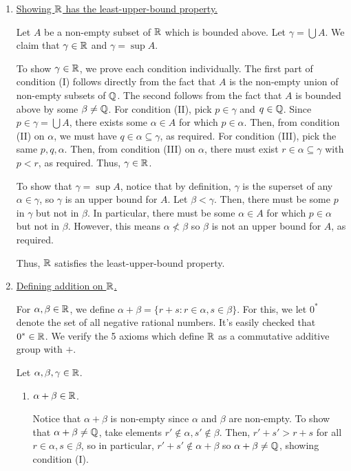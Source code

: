 \begin{enumerate}[Step 1.]
\item \underline{Showing $\mathbb{R}$ has the least-upper-bound property.}

Let $A$ be a non-empty subset of $\mathbb{R}$ which is bounded above. Let $\gamma = \bigcup A$. We claim that $\gamma \in \mathbb{R}$ and $\gamma = \sup A$. 

To show $\gamma \in \mathbb{R}$, we prove each condition individually. The first part of condition (I) follows directly from the fact that $A$ is the non-empty union of non-empty subsets of $\mathbb{Q}$. The second follows from the fact that $A$ is bounded above by some $\beta \ne \mathbb{Q}$. For condition (II), pick $p \in \gamma$ and $q \in \mathbb{Q}$. Since $p \in \gamma = \bigcup A$, there exists some $\alpha \in A$ for which $p \in \alpha$. Then, from condition (II) on $\alpha$, we must have $q \in \alpha \subseteq \gamma$, as required. For condition (III), pick the same $p, q, \alpha$. Then, from condition (III) on $\alpha$, there must exist $r \in \alpha \subseteq \gamma$ with $p < r$, as required. Thus, $\gamma \in \mathbb{R}$.

To show that $\gamma = \sup A$, notice that by definition, $\gamma$ is the superset of any $\alpha \in \gamma$, so $\gamma$ is an upper bound for $A$. Let $\beta < \gamma$. Then, there must be some $p$ in $ \gamma$ but not in $\beta$. In particular, there must be some $\alpha \in A$ for which $p \in \alpha$ but not in $\beta$. However, this means $\alpha \not< \beta$ so $\beta$ is not an upper bound for $A$, as required. 

Thus, $\mathbb{R}$ satisfies the least-upper-bound property.

\item \underline{Defining addition on $\mathbb{R}$.}

For $\alpha, \beta \in \mathbb{R}$, we define $\alpha + \beta = \{r + s : r \in \alpha, s \in \beta\}$. For this, we let $0^*$ denote the set of all negative rational numbers. It's easily checked that $0^* \in \mathbb{R}$. We verify the 5 axioms which define $\mathbb{R}$ as a commutative additive group with $+$.

Let $\alpha, \beta, \gamma \in \mathbb{R}$. 
\begin{enumerate}[({A}1)]
\item $\alpha + \beta \in \mathbb{R}$.

Notice that $\alpha + \beta$ is non-empty since $\alpha$ and $\beta$ are non-empty. To show that $\alpha + \beta \ne \mathbb{Q}$, take elements $r' \not\in \alpha, s' \not\in \beta$. Then, $r' + s' > r + s$ for all $r \in \alpha, s \in \beta$, so in particular, $r' + s' \not\in \alpha + \beta$ so $\alpha + \beta \ne \mathbb{Q}$, showing condition (I).


\end{enumerate}
\end{enumerate}
